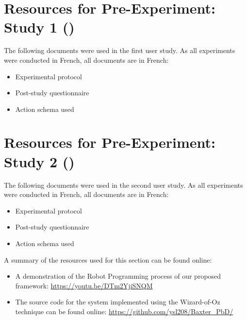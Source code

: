 \chapter{Resources for Pre-Experiment: Study 1 ()}
\label{app:exp1}
The following documents were used in the first user study. As all experiments were conducted in French, all documents are in French:
\begin{itemize}
	\item{Experimental protocol}
	\item{Post-study questionnaire}
	\item{Action schema used}
\end{itemize}




%

\chapter{Resources for Pre-Experiment: Study 2 () }
\label{app:exp2}
The following documents were used in the second user study. As all experiments were conducted in French, all documents are in French:
\begin{itemize}
	\item{Experimental protocol}
	\item{Post-study questionnaire}
	\item{Action schema used}
\end{itemize}
A summary of the resources used for this section can be found online:
\begin{itemize}
	\item A demonstration of the Robot Programming process of our proposed framework: \url{https://youtu.be/DTm2YjiSNQM}
	\item The source code for the system implemented using the Wizard-of-Oz technique can be found online: \url{https://github.com/ysl208/Baxter_PbD/}
\end{itemize}

